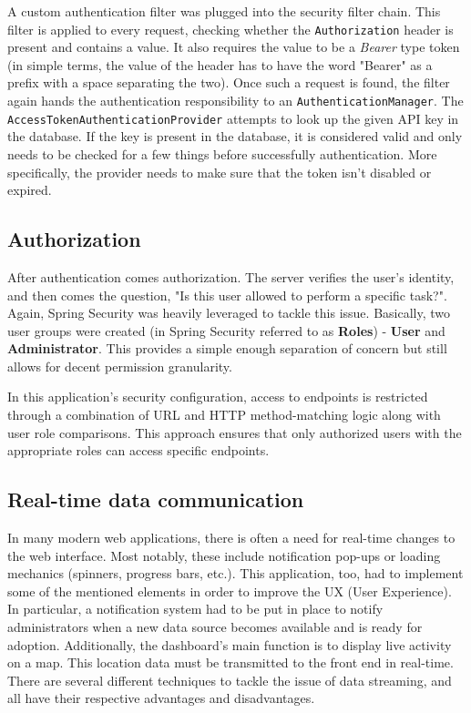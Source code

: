 \documentclass[FM,BP,EN,fonts]{tulthesis}
\begin{document}
A custom authentication filter was plugged into the security filter chain. This filter is applied to every request, checking whether the \verb|Authorization| header is present and contains a value. It also requires the value to be a \textit{Bearer} type token (in simple terms, the value of the header has to have the word "Bearer" as a prefix with a space separating the two). Once such a request is found, the filter again hands the authentication responsibility to an \verb|AuthenticationManager|. The \verb|AccessTokenAuthenticationProvider| attempts to look up the given API key in the database. If the key is present in the database, it is considered valid and only needs to be checked for a few things before successfully authentication. More specifically, the provider needs to make sure that the token isn't disabled or expired.

\subsection{Authorization}
After authentication comes authorization. The server verifies the user's identity, and then comes the question, "Is this user allowed to perform a specific task?". Again, Spring Security was heavily leveraged to tackle this issue. Basically, two user groups were created (in Spring Security referred to as \textbf{Roles}) - \textbf{User} and \textbf{Administrator}. This provides a simple enough separation of concern but still allows for decent permission granularity.

In this application's security configuration, access to endpoints is restricted through a combination of URL and HTTP method-matching logic along with user role comparisons. This approach ensures that only authorized users with the appropriate roles can access specific endpoints.

\subsection{Real-time data communication}
In many modern web applications, there is often a need for real-time changes to the web interface. Most notably, these include notification pop-ups or loading mechanics (spinners, progress bars, etc.). This application, too, had to implement some of the mentioned elements in order to improve the UX (User Experience). In particular, a notification system had to be put in place to notify administrators when a new data source becomes available and is ready for adoption. Additionally, the dashboard's main function is to display live activity on a map. This location data must be transmitted to the front end in real-time. There are several different techniques to tackle the issue of data streaming, and all have their respective advantages and disadvantages.
\end{document}
